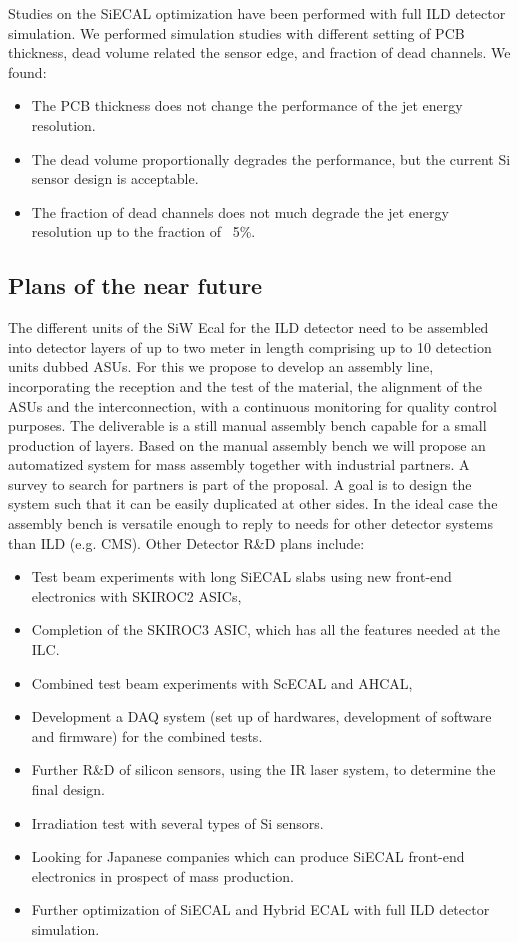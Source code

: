 Studies on the SiECAL optimization have been performed with full ILD detector simulation. We performed simulation studies with different setting of PCB thickness, dead volume related the sensor edge, and fraction of dead channels. We found:
\begin{itemize}
	\item The PCB thickness does not change the performance of the jet energy resolution.
	\item The dead volume proportionally degrades the performance, but the current Si sensor design is acceptable.
	\item The fraction of dead channels does not much degrade the jet energy resolution up to the fraction of ~5\%.
\end{itemize}

\subsection{Plans of the near future}
The different units of the SiW Ecal for the ILD detector need to be assembled into detector layers of up to two meter in length comprising up to 10 detection units dubbed ASUs. For this we propose to develop an assembly line, incorporating the reception and the test of the material, the alignment of the ASUs and the interconnection, with a continuous monitoring for quality control purposes. The deliverable is a still manual assembly bench capable for a small production of layers. Based on the manual assembly bench we will propose an automatized system for mass assembly together with industrial partners. A survey to search for partners is part of the proposal. A goal is to design the system such that it can be easily duplicated at other sides. In the ideal case the assembly bench is versatile enough to reply to needs for other detector systems than ILD (e.g. CMS). Other Detector R\&D plans include:
\begin{itemize}
\item Test beam experiments with long SiECAL slabs using new front-end electronics with SKIROC2 ASICs,
\item Completion of the SKIROC3 ASIC, which has all the features needed at the ILC.
\item Combined test beam experiments with ScECAL and AHCAL,
\item Development a DAQ system (set up of hardwares, development of software
and firmware) for the combined tests.
\item Further R\&D of silicon sensors, using the IR laser system, to determine the final design.
\item Irradiation test with several types of Si sensors.
\item Looking for Japanese companies which can produce SiECAL front-end
electronics in prospect of mass production.
\item Further optimization of SiECAL and Hybrid ECAL with full ILD detector simulation.
\end{itemize}

